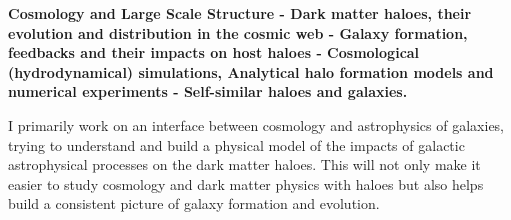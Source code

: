 


\textbf
{Cosmology and Large Scale Structure - Dark matter haloes, their evolution and distribution in the cosmic web - Galaxy formation, feedbacks and their impacts on host haloes - Cosmological (hydrodynamical) simulations, Analytical halo formation models and numerical experiments - Self-similar haloes and galaxies.}

I primarily work on an interface between cosmology and astrophysics of galaxies, trying to understand and build a physical model of the impacts of galactic astrophysical processes on the dark matter haloes. This will not only make it easier to study cosmology and dark matter physics with haloes but also helps build a consistent picture of galaxy formation and evolution.




